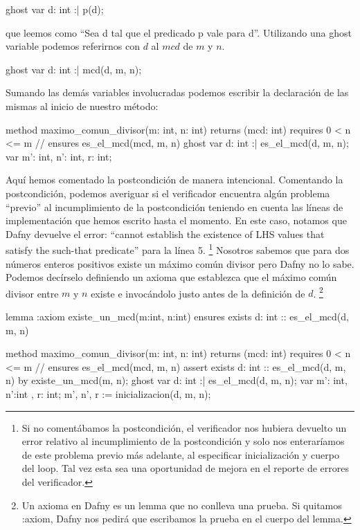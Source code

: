 \documentclass[12pt, a4paper, openany, fleqn]{book}
\begin{document}
    \begin{dafny}
ghost var d: int :| p(d);
    \end{dafny}

    \noindent que leemos como ``Sea d tal que el predicado p vale para d''. Utilizando una ghost variable podemos referirnos con $d$ al $mcd$ de $m$ y $n$.

    \begin{dafny}
ghost var d: int :| mcd(d, m, n);
    \end{dafny}

    Sumando las demás variables involucradas podemos escribir la declaración de las mismas al inicio de nuestro método:

    \begin{dafny}
method maximo_comun_divisor(m: int, n: int) returns (mcd: int)
    requires 0 < n <= m
    // ensures es_el_mcd(mcd, m, n)
{
    ghost var d: int :| es_el_mcd(d, m, n);
    var m': int, n': int, r: int;
}
    \end{dafny}

    Aquí hemos comentado la postcondición de manera intencional. Comentando la postcondición, podemos averiguar si el verificador encuentra algún problema ``previo'' al incumplimiento de la postcondición teniendo en cuenta las líneas de implementación que hemos escrito hasta el momento.
    En este caso, notamos que Dafny devuelve el error: ``cannot establish the existence of LHS values that satisfy the such-that predicate'' para la línea 5. \footnote{Si no comentábamos la postcondición, el verificador nos hubiera devuelto un error relativo al incumplimiento de la postcondición y solo nos enteraríamos de este problema previo más adelante, al especificar inicialización y cuerpo del loop. Tal vez esta sea una oportunidad de mejora en el reporte de errores del verificador.}
    Nosotros sabemos que para dos números enteros positivos existe un máximo común divisor pero Dafny no lo sabe. Podemos decírselo definiendo un axioma que establezca que el máximo común divisor entre $m$ y $n$ existe e invocándolo justo antes de la definición de $d$. \footnote{Un axioma en Dafny es un lemma que no conlleva una prueba. Si quitamos :axiom, Dafny nos pedirá que escribamos la prueba en el cuerpo del lemma.}

    \begin{dafny}
lemma {:axiom} existe_un_mcd(m:int, n:int)
    ensures exists d: int :: es_el_mcd(d, m, n)

method maximo_comun_divisor(m: int, n: int) returns (mcd: int)
    requires 0 < n <= m
    // ensures es_el_mcd(mcd, m, n)
{
    assert exists d: int :: es_el_mcd(d, m, n) by {
        existe_un_mcd(m, n);
    }
    ghost var d: int :| es_el_mcd(d, m, n);
    var m': int, n':int , r: int;
    m', n', r := inicializacion(d, m, n);
}
    \end{dafny}
\end{document}
